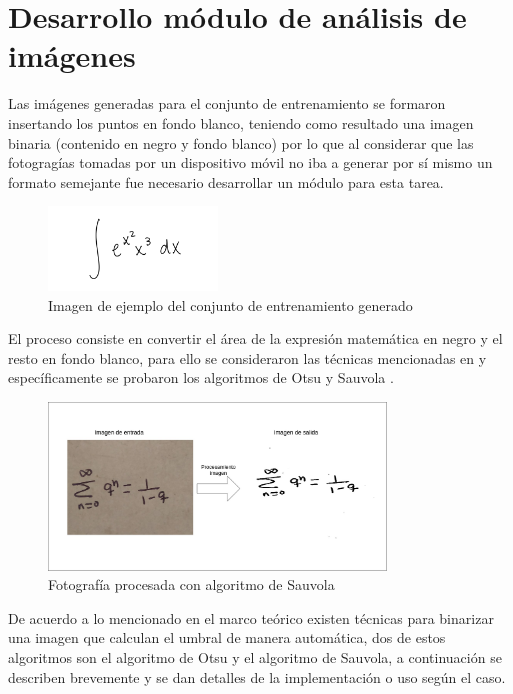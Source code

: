\section{Desarrollo módulo de análisis de imágenes}

Las imágenes generadas para el conjunto de entrenamiento se formaron insertando los puntos en fondo blanco, teniendo como resultado una imagen binaria (contenido en negro y fondo blanco) por lo que al considerar que las fotogragías tomadas por un dispositivo móvil no iba a generar por sí mismo un formato semejante fue necesario desarrollar un módulo para esta tarea.

\begin{figure}[h]
	\centering
	\includegraphics[width=0.4\textwidth]{capitulo5/imageprocessor/example_dataset.png}
	\caption{Imagen de ejemplo del conjunto de entrenamiento generado}
	\label{fig:example_dataset}
\end{figure}

El proceso consiste en convertir el área de la expresión matemática en negro y el resto en fondo blanco, para ello se consideraron las técnicas mencionadas en %
 y específicamente se probaron los algoritmos de Otsu y Sauvola \cite{inproceedings}.
 
\begin{figure}[h]
	\centering
	\includegraphics[width=0.8\textwidth]{capitulo5/imageprocessor/IO_image.jpg}
	\caption{Fotografía procesada con algoritmo de Sauvola}
	\label{fig:process_image}
\end{figure}

De acuerdo a lo mencionado en el marco teórico existen técnicas para binarizar una imagen que calculan el umbral de manera automática, dos de estos algoritmos son el algoritmo de Otsu y el algoritmo de Sauvola, a continuación se describen brevemente y se dan detalles de la implementación o uso según el caso.

